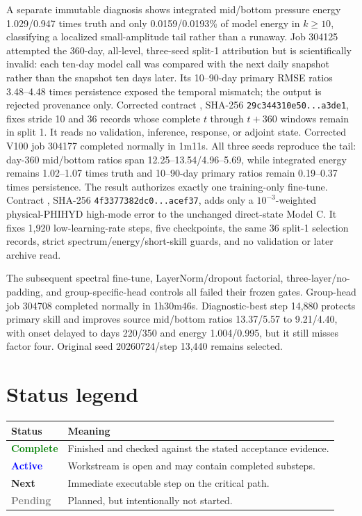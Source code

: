 \documentclass[11pt]{article}
\newcommand{\Done}{\textcolor{green}{\textbf{Complete}}}
\newcommand{\Active}{\textcolor{blue}{\textbf{Active}}}
\newcommand{\Next}{\textcolor{amber}{\textbf{Next}}}
\newcommand{\Pending}{\textcolor{graytext}{\textbf{Pending}}}
\begin{document}
A separate immutable diagnosis shows integrated mid/bottom pressure energy
1.029/0.947 times truth and only 0.0159/0.0193\% of model energy in
\(k\geq10\), classifying a localized small-amplitude tail rather than a
runaway.  Job 304125 attempted the 360-day, all-level, three-seed split-1
attribution but is scientifically invalid: each ten-day model call was compared
with the next daily snapshot rather than the snapshot ten days later.  Its
10--90-day primary RMSE ratios 3.48--4.48 times persistence exposed the
temporal mismatch; the output is rejected provenance only.  Corrected contract
,
SHA-256 \texttt{29c344310e50...a3de1}, fixes stride 10 and 36 records whose
complete \(t\) through \(t+360\) windows remain in split 1.  It reads no
validation, inference, response, or adjoint state.  Corrected V100 job 304177
completed normally in 1m11s.  All three seeds reproduce the tail: day-360
mid/bottom ratios span 12.25--13.54/4.96--5.69, while integrated energy remains
1.02--1.07 times truth and 10--90-day primary ratios remain 0.19--0.37 times
persistence.  The result authorizes exactly one training-only fine-tune.
Contract
,
SHA-256 \texttt{4f3377382dc0...acef37}, adds only a \(10^{-3}\)-weighted
physical-PHIHYD high-mode error to the unchanged direct-state Model C.  It
fixes 1,920 low-learning-rate steps, five checkpoints, the same 36 split-1
selection records, strict spectrum/energy/short-skill guards, and no validation
or later archive read.

The subsequent spectral fine-tune, LayerNorm/dropout factorial,
three-layer/no-padding, and group-specific-head controls all failed their
frozen gates.  Group-head job 304708 completed normally in 1h30m46s.
Diagnostic-best step 14,880 protects primary skill and improves source
mid/bottom ratios 13.37/5.57 to 9.21/4.40, with onset delayed to days
220/350 and energy 1.004/0.995, but it still misses factor four.  Original
seed 20260724/step 13,440 remains selected.
\par\endgroup

\section{Status legend}

\begin{tabularx}{\textwidth}{@{}p{}Y@{}}
\toprule
\textbf{Status} & \textbf{Meaning} \\
\midrule
\Done & Finished and checked against the stated acceptance evidence. \\
\Active & Workstream is open and may contain completed substeps. \\
\Next & Immediate executable step on the critical path. \\
\Pending & Planned, but intentionally not started. \\
\bottomrule
\end{tabularx}
\end{document}
